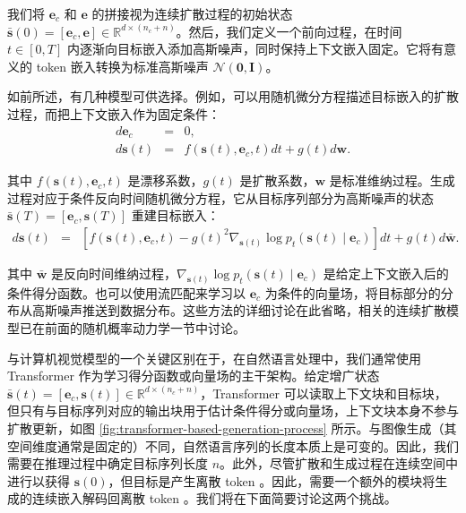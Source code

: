 我们将 $\mathbf{e}_c$ 和 $\mathbf{e}$ 的拼接视为连续扩散过程的初始状态 $\bar{\mathbf{s}}(0) = [\mathbf{e}_c,\mathbf{e}] \in \mathbb{R}^{d \times (n_c + n)}$。然后，我们定义一个前向过程，在时间 $t \in [0, T]$ 内逐渐向目标嵌入添加高斯噪声，同时保持上下文嵌入固定。它将有意义的 token 嵌入转换为标准高斯噪声 $\mathcal{N}(\mathbf{0}, \mathbf{I})$。

如前所述，有几种模型可供选择。例如，可以用随机微分方程描述目标嵌入的扩散过程，而把上下文嵌入作为固定条件：
\begin{eqnarray}
d\mathbf{e}_c & = & 0, \nonumber\\
d \mathbf{s}(t) & = & f(\mathbf{s}(t),\mathbf{e}_c,t) d t + g(t) d\mathbf{w}.
\label{eq:diffusion-embedding}\label{eq:diffusion-embedding-nobar}
\end{eqnarray}

\noindent 其中 $f(\mathbf{s}(t),\mathbf{e}_c,t)$ 是漂移系数，$g(t)$ 是扩散系数，$\mathbf{w}$ 是标准维纳过程。生成过程对应于条件反向时间随机微分方程，它从目标序列部分为高斯噪声的状态 $\bar{\mathbf{s}}(T)=[\mathbf{e}_c,\mathbf{s}(T)]$ 重建目标嵌入：
\begin{eqnarray}
d \mathbf{s}(t) & = & \left[f(\mathbf{s}(t),\mathbf{e}_c,t)-g(t)^2\nabla_{\mathbf{s}(t)}
\log p_t(\mathbf{s}(t)\mid\mathbf{e}_c)\right]dt+g(t)d\bar{\mathbf{w}}.
\label{eq:generation-embedding}\label{eq:generation-embedding-nobar}
\end{eqnarray}

\noindent 其中 $\bar{\mathbf{w}}$ 是反向时间维纳过程，$\nabla_{\mathbf{s}(t)}\log p_t(\mathbf{s}(t)\mid\mathbf{e}_c)$ 是给定上下文嵌入后的条件得分函数。也可以使用流匹配来学习以 $\mathbf{e}_c$ 为条件的向量场，将目标部分的分布从高斯噪声推送到数据分布。这些方法的详细讨论在此省略，相关的连续扩散模型已在前面的随机概率动力学一节中讨论。

与计算机视觉模型的一个关键区别在于，在自然语言处理中，我们通常使用 Transformer 作为学习得分函数或向量场的主干架构。给定增广状态 $\bar{\mathbf{s}}(t) = [\mathbf{e}_c, \mathbf{s}(t)] \in \mathbb{R}^{d \times (n_c + n)}$，Transformer 可以读取上下文块和目标块，但只有与目标序列对应的输出块用于估计条件得分或向量场，上下文块本身不参与扩散更新，如图 \ref{fig:transformer-based-generation-process} 所示。与图像生成（其空间维度通常是固定的）不同，自然语言序列的长度本质上是可变的。因此，我们需要在推理过程中确定目标序列长度 $n$。此外，尽管扩散和生成过程在连续空间中进行以获得 $\mathbf{s}(0)$，但目标是产生离散 token 。因此，需要一个额外的模块将生成的连续嵌入解码回离散 token 。我们将在下面简要讨论这两个挑战。

